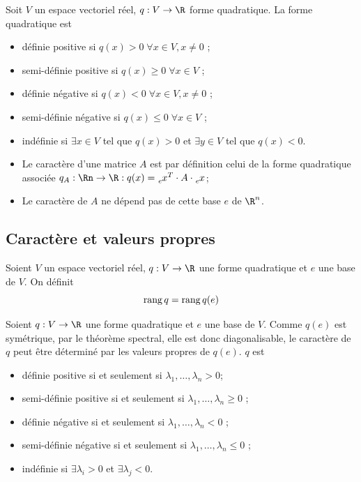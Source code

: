\begin{mydef}
	Soit $V$ un espace vectoriel réel, $q : V \rightarrow \R$ forme quadratique. La forme quadratique est
	\begin{itemize}
		\item définie positive si $q(x) >0 \; \forall x \in V, x \neq 0$ ;
		\item semi-définie positive si $q(x) \geq 0 \; \forall x \in V$ ;
		\item définie négative si $q(x) < 0 \; \forall x \in V, x \neq 0$ ;
		\item semi-définie négative si $q(x) \leq 0 \; \forall x \in V$ ;
		\item indéfinie si $\exists x \in V$ tel que $q(x) > 0$ et $\exists y \in V$ tel que $q(x) < 0$.
	\end{itemize}
\end{mydef}

\begin{myprop}
	\InsertTheoremBreak
	\begin{itemize}
		\item Le caractère d'une matrice $A$ est par définition celui de la forme quadratique associée
			$q_A: \Rn \to \R: q(x) = \tensor[_e]{x}{^T} \cdot A \cdot \tensor[_e]{x}{}$;
		\item Le caractère de $A$ ne dépend pas de cette base $e$ de $\R^n$.
	\end{itemize}
\end{myprop}

\subsection{Caractère et valeurs propres}

\begin{mydef}
	Soient $V$ un espace vectoriel réel, $q : V \rightarrow \R$ une forme quadratique et $e$ une base de $V$.
	On définit
	\[ \operatorname{rang} q = \operatorname{rang} q(e) \]
\end{mydef}

\begin{myprop}
	Soient $q: V \to \R$ une forme quadratique et $e$ une base de $V$.
	Comme $q(e)$ est symétrique, par le théorème spectral, elle est donc diagonalisable,
	le caractère de $q$ peut être déterminé par les valeurs propres de $q(e)$. $q$ est
	\begin{itemize}
		\item définie positive si et seulement si $\lambda_1, \dots, \lambda_n > 0$;
		\item semi-définie positive si et seulement si $\lambda_1, \dots, \lambda_n \geq 0$ ;
		\item définie négative si et seulement si $\lambda_1, \dots, \lambda_n < 0$ ;
		\item semi-définie négative si et seulement si $\lambda_1, \dots, \lambda_n \leq 0$ ;
		\item indéfinie si $\exists  \lambda_i > 0$ et $\exists \lambda_j < 0$.
	\end{itemize}
\end{myprop}

